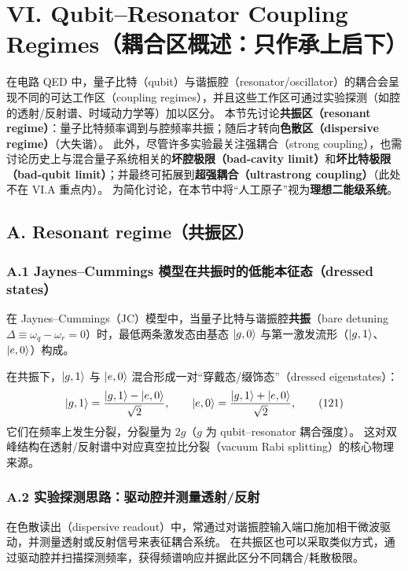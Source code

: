 \documentclass[12pt,a4paper,oneside]{ctexbook}
\begin{document}
\section{VI. Qubit--Resonator Coupling Regimes（耦合区概述：只作承上启下）}
在电路 QED 中，量子比特（qubit）与谐振腔（resonator/oscillator）的耦合会呈现不同的可达工作区（coupling regimes），并且这些工作区可通过实验探测（如腔的透射/反射谱、时域动力学等）加以区分。
本节先讨论\textbf{共振区（resonant regime）}：量子比特频率调到与腔频率共振；随后才转向\textbf{色散区（dispersive regime）}（大失谐）。
此外，尽管许多实验最关注强耦合（strong coupling），也需讨论历史上与混合量子系统相关的\textbf{坏腔极限（bad-cavity limit）}和\textbf{坏比特极限（bad-qubit limit）}；并最终可拓展到\textbf{超强耦合（ultrastrong coupling）}（此处不在 VI.A 重点内）。
为简化讨论，在本节中将“人工原子”视为\textbf{理想二能级系统}。

\subsection{A. Resonant regime（共振区）}

\subsubsection{A.1 Jaynes--Cummings 模型在共振时的低能本征态（dressed states）}
在 Jaynes--Cummings（JC）模型中，当量子比特与谐振腔\textbf{共振}（bare detuning $\Delta\equiv \omega_q-\omega_r=0$）时，最低两条激发态由基态 $\ket{g,0}$ 与第一激发流形（$\ket{g,1}$、$\ket{e,0}$）构成。

在共振下，$\ket{g,1}$ 与 $\ket{e,0}$ 混合形成一对“穿戴态/缀饰态”（dressed eigenstates）：
\begin{equation}
\ket{g,1}=\frac{\ket{g,1}-\ket{e,0}}{\sqrt{2}},\qquad
\ket{e,0}=\frac{\ket{g,1}+\ket{e,0}}{\sqrt{2}},
\tag{121}
\end{equation}
它们在频率上发生分裂，分裂量为 $2g$（$g$ 为 qubit--resonator 耦合强度）。
这对双峰结构在透射/反射谱中对应真空拉比分裂（vacuum Rabi splitting）的核心物理来源。

\subsubsection{A.2 实验探测思路：驱动腔并测量透射/反射}
在色散读出（dispersive readout）中，常通过对谐振腔输入端口施加相干微波驱动，并测量透射或反射信号来表征耦合系统。
在共振区也可以采取类似方式，通过驱动腔并扫描探测频率，获得频谱响应并据此区分不同耦合/耗散极限。
\end{document}
